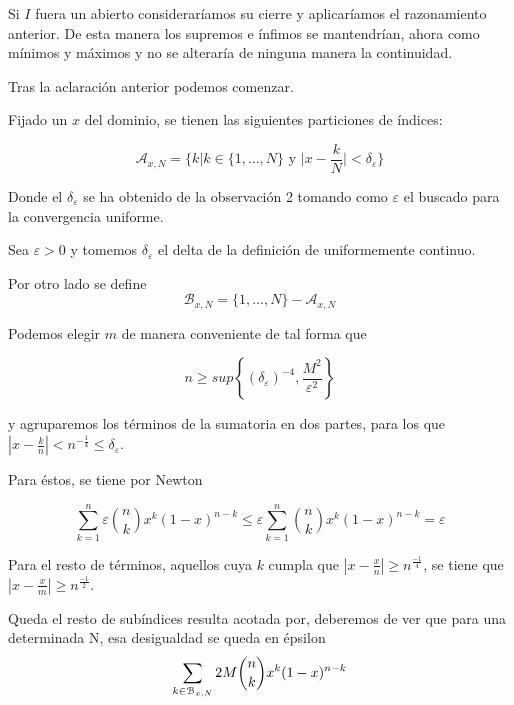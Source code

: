 Si $I$ fuera un abierto consideraríamos su cierre y aplicaríamos el razonamiento anterior. 
De esta manera los supremos e ínfimos se mantendrían, ahora como mínimos y máximos y no se alteraría
de ninguna manera la continuidad. 

Tras la aclaración anterior podemos comenzar.

Fijado un $x$ del dominio, se tienen las siguientes particiones de índices: 
    
$$\mathcal{A}_{x,N} = \{ k | k \in \{1, ..., N\} \text{ y }  |x- \frac{k}{N}| < \delta_\varepsilon \}$$

Donde el $\delta_\varepsilon$ se ha obtenido de la observación 2 tomando como $\varepsilon$ el 
buscado para la convergencia uniforme. 

Sea $\varepsilon > 0$ y tomemos $\delta_ \varepsilon$ el delta de la definición de uniformemente continuo.

Por otro lado se define
$$\mathcal{B}_{x,N} = \{1, ..., N\} - \mathcal{A}_{x,N}$$


Podemos elegir $m$ de manera conveniente de tal forma que 

$$ n \geq sup \left\{ (\delta_\varepsilon) ^{-4}, \frac{M^2}{\varepsilon^2}\right\}$$


y agruparemos los términos de la sumatoria en dos partes, para los que 
$|x - \frac{k}{n}| < n^{ -\frac{1}{4}} \leq \delta_\varepsilon$. 

Para éstos,  se tiene por Newton  

\begin{equation*}
    \sum_{k=1}^n   \varepsilon \binom{n}{k} x^k (1-x)^{n-k} \leq \varepsilon \sum_{k=1}^n \binom{n}{k} x^k (1-x)^{n-k} =  \varepsilon
\end{equation*}

Para el resto de términos, aquellos cuya $k$ cumpla que $|x - \frac{x}{n}| \geq n ^\frac{-1}{4}$, se tiene que 
$|x - \frac{x}{m}| \geq n ^\frac{-1}{2}$. 

Queda el resto de subíndices resulta acotada por, deberemos de ver que para una determinada N, 
esa desigualdad se queda en épsilon
\begin{equation*}
    \sum_{k \in \mathcal{B}_{x,N}} 2M \binom{n}{k} x^k (1-x) ^{n-k} \\
\end{equation*}
